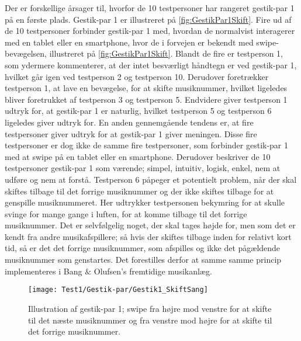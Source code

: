 \noindent
Der er forskellige årsager til, hvorfor de 10 testpersoner har rangeret gestik-par 1 på en første plads. Gestik-par 1 er illustreret på \autoref{fig:GestikPar1Skift}. Fire ud af de 10 testpersoner forbinder gestik-par 1 med, hvordan de normalvist interagerer med en tablet eller en smartphone, hvor de i forvejen er bekendt med swipe-bevægelsen, illustreret på \autoref{fig:GestikPar1Skift}. Blandt de fire er testperson 1, som ydermere kommenterer, at der intet besværligt håndtegn er ved gestik-par 1, hvilket går igen ved testperson 2 og testperson 10. Derudover foretrækker testperson 1, at lave en bevægelse, for at skifte musiknummer, hvilket ligeledes bliver foretrukket af testperson 3 og testperson 5. Endvidere giver testperson 1 udtryk for, at gestik-par 1 er naturlig, hvilket testperson 5 og testperson 6 ligeledes giver udtryk for. En anden gennemgående tendens er, at fire testpersoner giver udtryk for at gestik-par 1 giver meningen. Disse fire testpersoner er dog ikke de samme fire testpersoner, som forbinder gestik-par 1 med at swipe på en tablet eller en smartphone. Derudover beskriver de 10 testpersoner gestik-par 1 som værende; simpel, intuitiv, logisk, enkel, nem at udføre og nem at forstå. Testperson 6 påpeger et potentielt problem, når der skal skiftes tilbage til det forrige musiknummer og der ikke skiftes tilbage for at genspille musiknummeret. Her udtrykker testpersonen bekymring for at skulle svinge for mange gange i luften, for at komme tilbage til det forrige musiknummer. Det er selvfølgelig noget, der skal tages højde for, men som det er kendt fra andre musikafspillere; så hvis der skiftes tilbage inden for relativt kort tid, så er det det forrige musiknummer, som afspilles og ikke det pågældende musiknummer som genstartes. Det forestilles derfor at samme samme princip implementeres i Bang $\&$ Olufsen's fremtidige musikanlæg. 
%
\begin{figure}[H]
	\centering
	\texttt{[image: Test1/Gestik-par/Gestik1\_SkiftSang]}
	\caption{Illustration af gestik-par 1; swipe fra højre mod venstre for at skifte til det næste musiknummer og fra venstre mod højre for at skifte til det forrige musiknummer.}
	\label{fig:GestikPar1Skift}
\end{figure}
\noindent
% 
